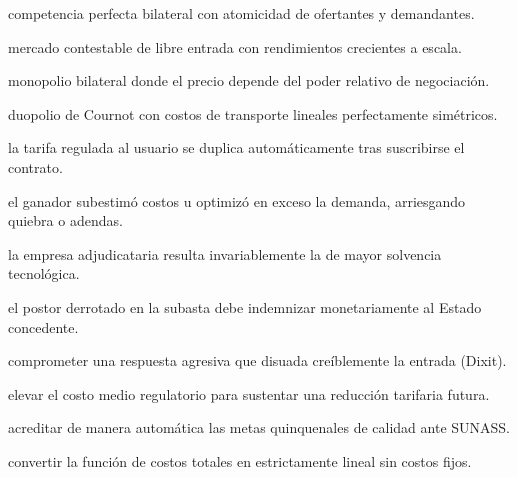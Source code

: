 \begin{opts}
    \item competencia perfecta bilateral con atomicidad de ofertantes y demandantes.
    \item mercado contestable de libre entrada con rendimientos crecientes a escala.
    \item monopolio bilateral donde el precio depende del poder relativo de negociación.
    \item duopolio de Cournot con costos de transporte lineales perfectamente simétricos.
\end{opts}

\begin{opts}
    \item la tarifa regulada al usuario se duplica automáticamente tras suscribirse el contrato.
    \item el ganador subestimó costos u optimizó en exceso la demanda, arriesgando quiebra o adendas.
    \item la empresa adjudicataria resulta invariablemente la de mayor solvencia tecnológica.
    \item el postor derrotado en la subasta debe indemnizar monetariamente al Estado concedente.
\end{opts}

\begin{opts}
    \item comprometer una respuesta agresiva que disuada creíblemente la entrada (Dixit).
    \item elevar el costo medio regulatorio para sustentar una reducción tarifaria futura.
    \item acreditar de manera automática las metas quinquenales de calidad ante SUNASS.
    \item convertir la función de costos totales en estrictamente lineal sin costos fijos.
\end{opts}

